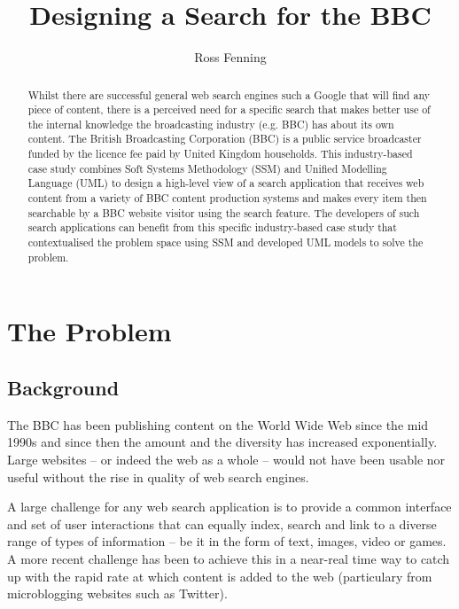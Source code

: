 \documentclass[oribibl]{llncs}
\title{Designing a Search for the BBC}
\author{Ross Fenning\inst{1}}
\institute{BBC \email{Ross.Fenning@bbc.co.uk}}
\begin{document}
\maketitle

\begin{abstract}

Whilst there are successful general web search engines such a Google that
will find any piece of content, there is a perceived need for a specific
search that makes better use of the internal knowledge the broadcasting
industry (e.g. BBC) has about its own content. The British Broadcasting
Corporation (BBC) is a public service broadcaster funded by the licence
fee paid by United Kingdom households. This industry-based case study
combines Soft Systems Methodology (SSM) and Unified Modelling Language
(UML) to design a high-level view of a search application that receives
web content from a variety of BBC content production systems and makes
every item then searchable by a BBC website visitor using the search
feature. The developers of such search applications can benefit from this
specific industry-based case study that contextualised the problem space
using SSM and developed UML models to solve the problem.

\end{abstract}

\section{The Problem}

\subsection{Background}

The BBC has been publishing content on the World Wide Web since the
mid 1990s and since then the amount and the diversity has increased
exponentially. Large websites -- or indeed the web as a whole --
would not have been usable nor useful without the rise in quality of
web search engines.

A large challenge for any web search application is to provide a common
interface and set of user interactions that can equally index, search
and link to a diverse range of types of information -- be it in the form
of text, images, video or games. A more recent challenge has been to
achieve this in a near-real time way to catch up with the rapid rate at
which content is added to the web (particulary from microblogging websites
such as Twitter).
\end{document}
